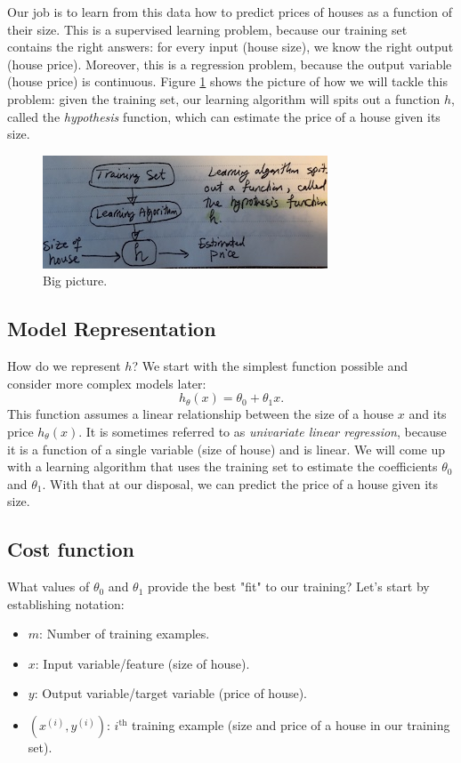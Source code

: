 \documentclass{article}
\theoremstyle{definition}
\begin{document}
Our job is to learn from this data how to predict prices of houses as a function of their size. This is a supervised learning problem, because our training set contains the right answers: for every input (house size), we know the right output (house price). Moreover, this is a regression problem, because the output variable (house price) is continuous. Figure \ref{linreg-bigpic} shows the picture of how we will tackle this problem: given the training set, our learning algorithm will spits out a function $h$, called the \textit{hypothesis} function, which can estimate the price of a house given its size.

\begin{figure}[ht]
\centering
\includegraphics[scale=0.8]{images/lin_reg/big-picture.jpg}
\caption{Big picture.}
\label{linreg-bigpic}
\end{figure}

\subsection{Model Representation}
How do we represent $h$? We start with the simplest function possible and consider more complex models later:
\begin{equation}
    h_{\theta}(x) = \theta_0 + \theta_1 x.
    \label{linreg-eq:univar-hypothesis}
\end{equation}
This function assumes a linear relationship between the size of a house $x$ and its price $h_{\theta}(x)$. It is sometimes referred to as \textit{univariate linear regression}, because it is a function of a single variable (size of house) and is linear. We will come up with a learning algorithm that uses the training set to estimate the coefficients $\theta_0$ and $\theta_1$. With that at our disposal, we can predict the price of a house given its size. 


\subsection{Cost function}
What values of $\theta_0$ and $\theta_1$ provide the best "fit" to our training? Let's start by establishing notation:
\begin{itemize}
    \item $m$: Number of training examples.
    \item $x$: Input variable/feature (size of house).
    \item $y$: Output variable/target variable (price of house).
    \item $(x^{(i)}, y^{(i)})$: $i^{\text{th}}$ training example (size and price of a house in our training set).
\end{itemize}
\end{document}
